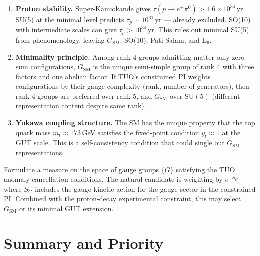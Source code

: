 \documentclass[12pt,a4paper]{article}
\theoremstyle{remark}
\begin{document}
\begin{enumerate}
  \item \textbf{Proton stability.}
    Super-Kamiokande gives $\tau(p\to e^+\pi^0) > 1.6\times10^{34}$\,yr.
    SU(5) at the minimal level predicts $\tau_p \sim 10^{31}$\,yr ---
    already excluded.
    SO(10) with intermediate scales can give $\tau_p > 10^{34}$\,yr.
    This rules out minimal SU(5) from phenomenology, leaving
    $G_\mathrm{SM}$, SO(10), Pati-Salam, and $\mathrm{E}_6$.

  \item \textbf{Minimality principle.}
    Among rank-4 groups admitting matter-only zero-sum configurations,
    $G_\mathrm{SM}$ is the unique semi-simple group of rank 4 with
    three factors and one abelian factor.
    If TUO's constrained PI weights configurations by their gauge
    complexity (rank, number of generators), then rank-4 groups are
    preferred over rank-5, and $G_\mathrm{SM}$ over $\mathrm{SU}(5)$
    (different representation content despite same rank).

  \item \textbf{Yukawa coupling structure.}
    The SM has the unique property that the top quark mass
    $m_t \approx 173$\,GeV satisfies the fixed-point condition
    $y_t \approx 1$ at the GUT scale.
    This is a self-consistency condition that could single out
    $G_\mathrm{SM}$ representations.
\end{enumerate}

\begin{tcolorbox}[openbox,title={What closes OP6}]
Formulate a measure on the space of gauge groups $\{G\}$ satisfying
the TUO anomaly-cancellation conditions.
The natural candidate is weighting by $e^{-S_G}$ where $S_G$ includes
the gauge-kinetic action for the gauge sector in the constrained PI.
Combined with the proton-decay experimental constraint, this may
select $G_\mathrm{SM}$ or its minimal GUT extension.
\end{tcolorbox}

\section{Summary and Priority}
\label{sec:summary}
\end{document}
